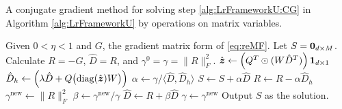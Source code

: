 \begin{algorithm}
\begin{algorithmic}[1]
        \EndFor
    \end{algorithmic}
\end{algorithm}


\begin{algorithm}[t]
    \caption{A conjugate gradient method for solving step \ref{alg:LrFrameworkU:CG} in Algorithm \ref{alg:LrFrameworkU} by operations on matrix variables.}
    \label{alg:Pcg}
    \begin{algorithmic}[1]
        \State Given $0<\eta<1$ and $G$, the gradient matrix form of \eqref{eq:reMF}. Let $S=\boldsymbol{0}_{d\times M}$.
        \State Calculate $R = -G$, $\hat{D}=R$, and $\gamma^0=\gamma=\|R\|_F^2$.
            \State $\hat{\boldsymbol{z}}\gets \left( {Q^T}\odot{(W\hat{D}^T)} \right) \boldsymbol{1}_{d\times 1}$
            \State $\hat{D}_h \gets \left(\lambda \hat{D} + Q \bigl(\operatorname*{diag}(\hat{\boldsymbol{z}}) W \bigr)\right)$
            \State $\alpha \gets \gamma / \langle \hat{D},\hat{D}_h \rangle$
            \State $S \gets S+\alpha \hat{D}$
            \State $R \gets R-\alpha \hat{D}_h$
            \State $\gamma^{\text{new}} \gets \|R\|_F^2$
            \State $\beta \gets \gamma^{\text{new}}/\gamma$
            \State $\hat{D} \gets R+\beta \hat{D}$
            \State $\gamma \gets \gamma^{\text{new}}$
        \EndWhile
        \State Output $S$ as the solution.
    \end{algorithmic}
\end{algorithm}
